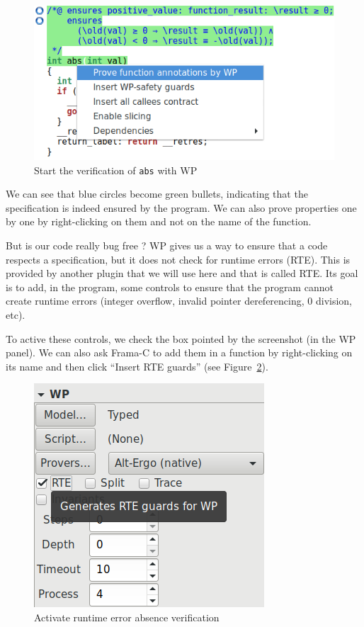 \documentclass[12pt,francais,]{scrbook}
\begin{document}
\begin{figure}[htbp]
\centering
\includegraphics[scale=0.5]{2-1-1-abs-2.png}
\caption{Start the verification of \texttt{abs} with WP}
\label{fig:2-1-1-abs-2}
\end{figure}

We can see that blue circles become green bullets, indicating that the
specification is indeed ensured by the program. We can also prove
properties one by one by right-clicking on them and not on the name of
the function.

But is our code really bug free ? WP gives us a way to ensure that a
code respects a specification, but it does not check for runtime errors
(RTE). This is provided by another plugin that we will use here and that
is called RTE. Its goal is to add, in the program, some controls to
ensure that the program cannot create runtime errors (integer overflow,
invalid pointer dereferencing, 0 division, etc).

To active these controls, we check the box pointed by the screenshot (in
the WP panel). We can also ask Frama-C to add them in a function by
right-clicking on its name and then click ``Insert RTE guards''
(see Figure~\ref{fig:2-1-1-abs-3}).

\begin{figure}[htbp]
\centering
\includegraphics[scale=0.5]{2-1-1-abs-3.png}
\caption{Activate runtime error absence verification}
\label{fig:2-1-1-abs-3}
\end{figure}
\end{document}
